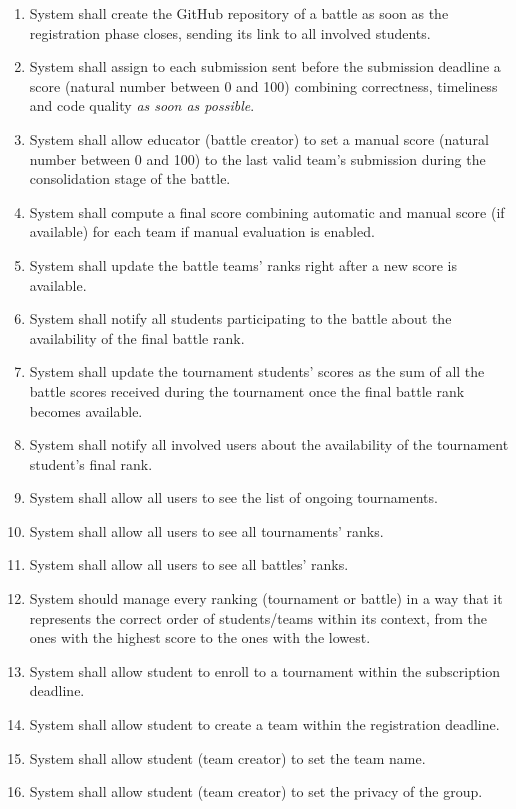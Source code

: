 \begin{enumerate}[label=$\bullet$ \textbf{R\arabic*:}]
    \item System shall create the GitHub repository of a battle as soon as the registration phase closes, sending its link to all involved students.
    \item System shall assign to each submission sent before the submission deadline a score (natural number between 0 and 100) combining correctness, timeliness and code quality \textit{as soon as possible}.
    \item System shall allow educator (battle creator) to set a manual score (natural number between 0 and 100) to the last valid team’s submission during the consolidation stage of the battle.
    \item System shall compute a final score combining automatic and manual score (if available) for each team if manual evaluation is enabled.
    \item System shall update the battle teams’ ranks right after a new score is available.
    \item System shall notify all students participating to the battle about the availability of the final battle rank.
    \item System shall update the tournament students’ scores as the sum of all the battle scores received during the tournament once the final battle rank becomes available.
    \item System shall notify all involved users about the availability of the tournament student’s final rank.
    \item System shall allow all users to see the list of ongoing tournaments.
    \item System shall allow all users to see all tournaments’ ranks.
    \item System shall allow all users to see all battles' ranks.
    \item System should manage every ranking (tournament or battle) in a way that it represents the correct order of students/teams within its context, from the ones with the highest score to the ones with the lowest.
    \item System shall allow student to enroll to a tournament within the subscription deadline.
    \item System shall allow student to create a team within the registration deadline.
    \item System shall allow student (team creator) to set the team name.
    \item System shall allow student (team creator) to set the privacy of the group.

\end{enumerate}
